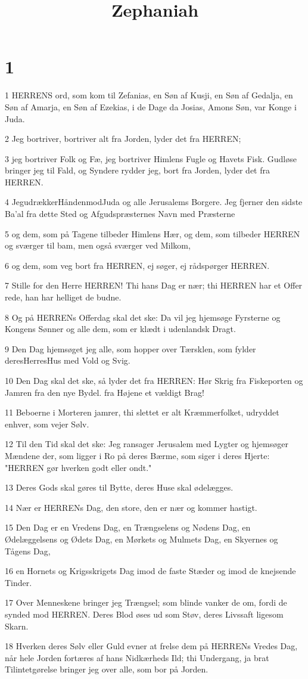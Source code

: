 

\title{Zephaniah}


\chapter{1}

\par 1 HERRENS ord, som kom til Zefanias, en Søn af Kusji, en Søn af Gedalja, en Søn af Amarja, en Søn af Ezekias, i de Dage da Josias, Amons Søn, var Konge i Juda.
\par 2 Jeg bortriver, bortriver alt fra Jorden, lyder det fra HERREN;
\par 3 jeg bortriver Folk og Fæ, jeg bortriver Himlens Fugle og Havets Fisk. Gudløse bringer jeg til Fald, og Syndere rydder jeg, bort fra Jorden, lyder det fra HERREN.
\par 4 JegudrækkerHåndenmodJuda og alle Jerusalems Borgere. Jeg fjerner den sidste Ba'al fra dette Sted og Afgudspræsternes Navn med Præsterne
\par 5 og dem, som på Tagene tilbeder Himlens Hær, og dem, som tilbeder HERREN og sværger til bam, men også sværger ved Milkom,
\par 6 og dem, som veg bort fra HERREN, ej søger, ej rådspørger HERREN.
\par 7 Stille for den Herre HERREN! Thi hans Dag er nær; thi HERREN har et Offer rede, han har helliget de budne.
\par 8 Og på HERRENs Offerdag skal det ske: Da vil jeg hjemsøge Fyrsterne og Kongens Sønner og alle dem, som er klædt i udenlandsk Dragt.
\par 9 Den Dag hjemsøget jeg alle, som hopper over Tærsklen, som fylder deresHerresHus med Vold og Svig.
\par 10 Den Dag skal det ske, så lyder det fra HERREN: Hør Skrig fra Fiskeporten og Jamren fra den nye Bydel. fra Højene et vældigt Brag!
\par 11 Beboerne i Morteren jamrer, thi slettet er alt Kræmmerfolket, udryddet enhver, som vejer Sølv.
\par 12 Til den Tid skal det ske: Jeg ransager Jerusalem med Lygter og hjemsøger Mændene der, som ligger i Ro på deres Bærme, som siger i deres Hjerte: "HERREN gør hverken godt eller ondt."
\par 13 Deres Gods skal gøres til Bytte, deres Huse skal ødelægges.
\par 14 Nær er HERRENs Dag, den store, den er nær og kommer hastigt.
\par 15 Den Dag er en Vredens Dag, en Trængselens og Nødens Dag, en Ødelæggelsens og Ødets Dag, en Mørkets og Mulmets Dag, en Skyernes og Tågens Dag,
\par 16 en Hornets og Krigsskrigets Dag imod de faste Stæder og imod de knejsende Tinder.
\par 17 Over Menneskene bringer jeg Trængsel; som blinde vanker de om, fordi de synded mod HERREN. Deres Blod øses ud som Støv, deres Livssaft ligesom Skarn.
\par 18 Hverken deres Sølv eller Guld evner at frelse dem på HERRENs Vredes Dag, når hele Jorden fortæres af hans Nidkærheds Ild; thi Undergang, ja brat Tilintetgørelse bringer jeg over alle, som bor på Jorden.


